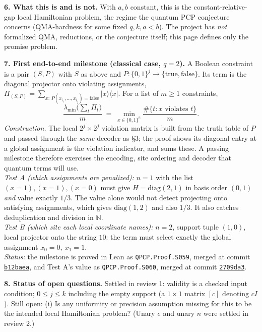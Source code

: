 \documentclass[10pt]{article}
\begin{document}
\textbf{6. What this is and is not.} With $a,b$ constant, this is the constant-relative-gap local Hamiltonian
problem, the regime the quantum PCP conjecture concerns (QMA-hardness for some fixed $q,k,a<b$). The project has
\emph{not} formalized QMA, reductions, or the conjecture itself; this page defines only the promise problem.

\textbf{7. First end-to-end milestone (classical case, $q=2$).} A Boolean constraint is a pair $(S,P)$ with $S$ as
above and $P:\{0,1\}^{j}\to\{\text{true},\text{false}\}$. Its term is the diagonal projector onto violating
assignments, $\Pi_{(S,P)}=\sum_{x:\,P(x_{i_1},\dots,x_{i_j})=\text{false}}|x\rangle\langle x|$. For a list of $m\ge1$ constraints,
\[
\frac{\lambda_{\min}\!\big(\sum_{t}\Pi_{t}\big)}{m}\;=\;\min_{x\in\{0,1\}^{n}}\frac{\#\{t: x \text{ violates } t\}}{m}.
\]
\emph{Construction.} The local $2^{j}\times2^{j}$ violation matrix is built from the truth table of $P$ and passed through the
\emph{same} decoder as \S3; the proof shows its diagonal entry at a global assignment is the violation indicator, and sums these.
A passing milestone therefore exercises the encoding, site ordering and decoder that quantum terms will use.\\
\emph{Test A (which assignments are penalized):} $n=1$ with the list $(x=1),(x=1),(x=0)$ must give
$H=\mathrm{diag}(2,1)$ in basis order $(0,1)$ \emph{and} value exactly $1/3$. The value alone would not detect projecting onto
satisfying assignments, which gives $\mathrm{diag}(1,2)$ and also $1/3$. It also catches deduplication and division in $\mathbb{N}$.\\
\emph{Test B (which site each local coordinate names):} $n=2$, support tuple $(1,0)$, local projector onto the string $10$:
the term must select exactly the global assignment $x_0=0,\ x_1=1$.\\
\emph{Status:} the milestone is proved in Lean as \texttt{QPCP.Proof.S059}, merged at commit \href{https://github.com/nareshgoud274/qpcp-proofs/commit/b12baeae87e390bc4d4f5cd20d0b9936f9aeaf4b}{\texttt{b12baea}}, and Test A's value as \texttt{QPCP.Proof.S060}, merged at commit \href{https://github.com/nareshgoud274/qpcp-proofs/commit/2709da3ed86338be2cd0603255b021cff437b8bd}{\texttt{2709da3}}.

\textbf{8. Status of open questions.}
Settled in review 1: validity is a checked input condition; $0\le j\le k$ including the empty support (a $1\times1$
matrix $[c]$ denoting $cI$). Still open:
(i) Is any uniformity or precision assumption missing for this to be the intended local Hamiltonian problem?
(Unary $e$ and unary $n$ were settled in review 2.)
\end{document}
